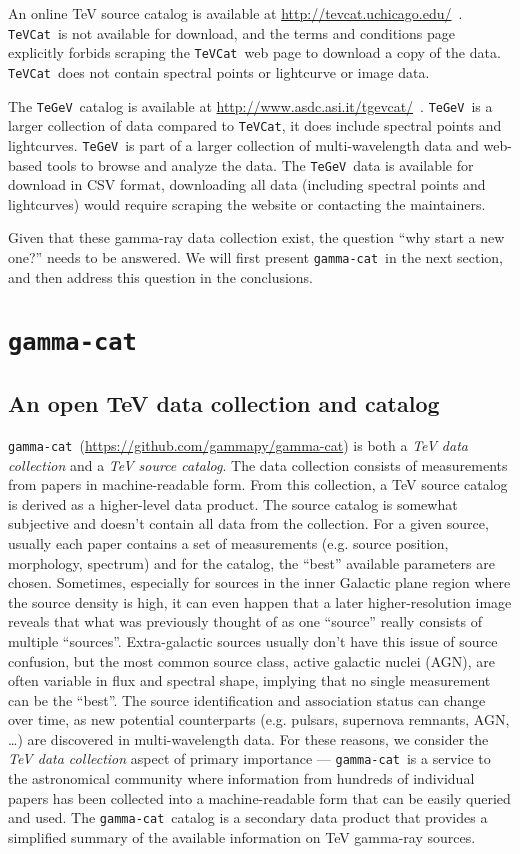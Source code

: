 \documentclass[11pt,twoside]{article}
\newcommand{\gammacat}{\texttt{gamma-cat}}
\newcommand{\tevcat}{\texttt{TeVCat}}
\newcommand{\tegev}{\texttt{TeGeV}}
\newcommand{\tevcaturl}{\url{http://tevcat.uchicago.edu/}}
\newcommand{\tgevcaturl}{\url{http://www.asdc.asi.it/tgevcat/}}
\newcommand{\gammacatgh}{\url{https://github.com/gammapy/gamma-cat}}
\begin{document}
An online TeV source catalog is available at \tevcaturl\ \citep{tevcat}.
\tevcat\ is not available for download, and the terms and conditions page
explicitly forbids scraping the \tevcat\ web page to download a copy of the data. \tevcat\ does not contain spectral points or lightcurve or image data.

The \tegev\ catalog is available at \tgevcaturl\ \citep{tgevcat}. \tegev\ is a
larger collection of data compared to \tevcat, it does include spectral points
and lightcurves. \tegev\ is part of a larger collection of multi-wavelength data
and web-based tools to browse and analyze the data. The \tegev\ data is
available for download in CSV format, downloading all data (including
spectral points and lightcurves) would require scraping the website or contacting the maintainers.

Given that these gamma-ray data collection exist, the question ``why start a new one?'' needs to be answered. We will first present \gammacat\ in the next section, and then address this question in the conclusions.

\section{\gammacat}
\label{sec:gammacat}

\subsection{An open TeV data collection and catalog}

\gammacat\ (\gammacatgh) is both a \emph{TeV data collection} and a \emph{TeV
source catalog}. The data collection consists of measurements from papers in
machine-readable form. From this collection, a TeV source catalog is derived as
a higher-level data product. The source catalog is somewhat subjective and
doesn't contain all data from the collection. For a given source, usually each
paper contains a set of measurements (e.g. source position, morphology,
spectrum) and for the catalog, the ``best'' available parameters are chosen.
Sometimes, especially for sources in the inner Galactic plane region where the
source density is high, it can even happen that a later higher-resolution image
reveals that what was previously thought of as one ``source'' really consists of
multiple ``sources''. Extra-galactic sources usually don't have this issue of
source confusion, but the most common source class, active galactic nuclei
(AGN), are often variable in flux and spectral shape, implying that no single
measurement can be the ``best''. The source identification and association
status can change over time, as new potential counterparts (e.g. pulsars,
supernova remnants, AGN, \ldots) are discovered in multi-wavelength data. For
these reasons, we consider the \emph{TeV data collection} aspect of primary
importance --- \gammacat\ is a service to the astronomical community where
information from hundreds of individual papers has been collected into a
machine-readable form that can be easily queried and used. The \gammacat\
catalog is a secondary data product that provides a simplified summary of the
available information on TeV gamma-ray sources.
\end{document}
